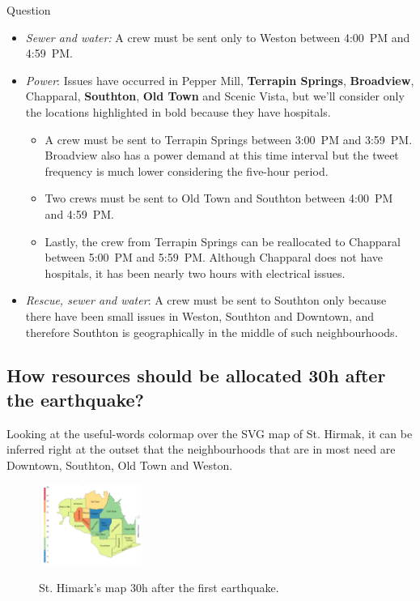 \documentclass{article}
\begin{document}
\begin{section}{Question}
\begin{itemize}
    \item \emph{Sewer and water:} A crew must be sent only to Weston between 
    4:00~PM and 4:59~PM.
    \smallskip 
    \item \emph{Power}: Issues have occurred in Pepper Mill, \textbf{Terrapin
    Springs}, \textbf{Broadview}, Chapparal, \textbf{Southton}, \textbf{Old 
    Town} and Scenic Vista, but we'll consider only the locations 
    highlighted in bold because they have hospitals.
    \begin{itemize}
        \item A crew must be sent to Terrapin Springs between 3:00~PM and
        3:59~PM. Broadview also has a power demand at this time interval but the
        tweet frequency is much lower considering the five-hour period.
        \item Two crews must be sent to Old Town and Southton between 4:00~PM 
        and 4:59~PM.
        \item Lastly, the crew from Terrapin Springs can be reallocated to
        Chapparal between 5:00~PM and 5:59~PM. Although Chapparal does not have
        hospitals, it has been nearly two hours with electrical issues.
    \end{itemize}
    \item \emph{Rescue, sewer and water}: A crew must be sent to Southton only
    because there have been small issues in Weston, Southton and Downtown, and
    therefore Southton is geographically in the middle of such neighbourhoods.
\end{itemize}

\newpage

\subsection{How resources should be allocated 30h after the earthquake?}
Looking at the useful-words colormap over the SVG map of St. Hirmak, it can be
inferred right at the outset that the neighbourhoods that are in most need are
Downtown, Southton, Old Town and Weston.

\begin{figure}[!h]
    \centering
    \includegraphics[width=0.30\textwidth]{figs/cond_30h/cond_30h_svg.png}
    \label{fig:map_30h}
    \caption{St. Himark's map 30h after the first earthquake.}
\end{figure}


\end{section}
\end{document}
